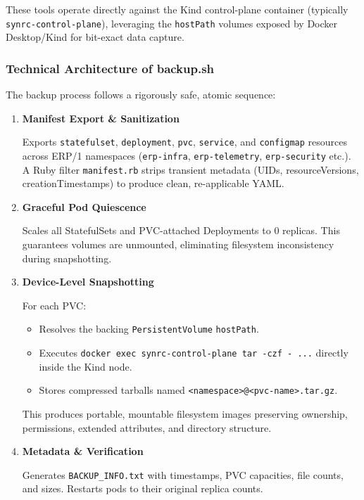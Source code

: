 \documentclass{article}
\begin{document}
These tools operate directly against the Kind control-plane container (typically \texttt{synrc-control-plane}),
leveraging the \texttt{hostPath} volumes exposed by Docker Desktop/Kind for bit-exact data capture.

\subsubsection{Technical Architecture of backup.sh}

The backup process follows a rigorously safe, atomic sequence:

\begin{enumerate}

\item \textbf{Manifest Export \& Sanitization}

  Exports \texttt{statefulset}, \texttt{deployment}, \texttt{pvc}, \texttt{service}, and \texttt{configmap}
  resources across ERP/1 namespaces (\texttt{erp-infra}, \texttt{erp-telemetry}, \texttt{erp-security} etc.).
  A Ruby filter \texttt{manifest.rb} strips transient metadata (UIDs, resourceVersions, creationTimestamps)
  to produce clean, re-applicable YAML.

\item \textbf{Graceful Pod Quiescence}

  Scales all StatefulSets and PVC-attached Deployments to 0 replicas.
  This guarantees volumes are unmounted, eliminating filesystem inconsistency during snapshotting.

\item \textbf{Device-Level Snapshotting}

  For each PVC:
  \begin{itemize}
  \item Resolves the backing \texttt{PersistentVolume} \texttt{hostPath}.
  \item Executes \texttt{docker exec synrc-control-plane tar -czf - ...} directly inside the Kind node.
  \item Stores compressed tarballs named \texttt{<namespace>@<pvc-name>.tar.gz}.
  \end{itemize}
  This produces portable, mountable filesystem images preserving ownership, permissions, extended attributes, and directory structure.

\item \textbf{Metadata \& Verification}

  Generates \texttt{BACKUP\_INFO.txt} with timestamps,
  PVC capacities, file counts, and sizes. Restarts pods to their original replica counts.
\end{enumerate}
\end{document}
